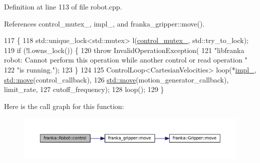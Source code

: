 Definition at line 113 of file robot.\+cpp.



References control\+\_\+mutex\+\_\+, impl\+\_\+, and franka\+\_\+gripper\+::move().


\begin{DoxyCode}
117                                              \{
118   std::unique\_lock<std::mutex> l(\hyperlink{classfranka_1_1Robot_a719ad1fab76f8edfc9f6f761671c1375}{control\_mutex\_}, std::try\_to\_lock);
119   \textcolor{keywordflow}{if} (!l.owns\_lock()) \{
120     \textcolor{keywordflow}{throw} InvalidOperationException(
121         \textcolor{stringliteral}{"libfranka robot: Cannot perform this operation while another control or read operation "}
122         \textcolor{stringliteral}{"is running."});
123   \}
124 
125   ControlLoop<CartesianVelocities> loop(*\hyperlink{classfranka_1_1Robot_aca155054184e5b6478942fd6a1b82ba4}{impl\_}, \hyperlink{namespacefranka__gripper_a1356a87108d2229401d3755bd3e53bdf}{std::move}(control\_callback),
126                                         \hyperlink{namespacefranka__gripper_a1356a87108d2229401d3755bd3e53bdf}{std::move}(motion\_generator\_callback), limit\_rate,
127                                         cutoff\_frequency);
128   loop();
129 \}
\end{DoxyCode}
Here is the call graph for this function\+:
\nopagebreak
\begin{figure}[H]
\begin{center}
\leavevmode
\includegraphics[width=350pt]{classfranka_1_1Robot_a3cc02de96810eebc74f499f5821f2ac9_cgraph}
\end{center}
\end{figure}
\mbox{\label{classfranka_1_1Robot_a8a41a2f208cc0c7e68569a550af4e1b2}} 
